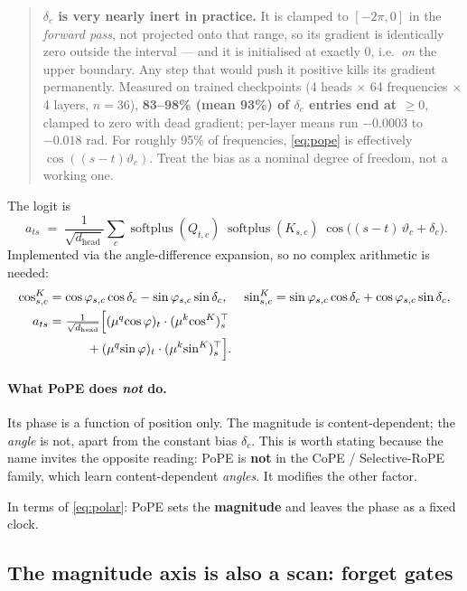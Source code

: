 \documentclass[11pt]{article}
\newcommand{\hd}{d_{\mathrm{head}}}
\DeclareMathOperator{\softplus}{softplus}
\begin{document}
\begin{quote}\small
\textbf{$\delta_c$ is very nearly inert in practice.} It is clamped to $[-2\pi, 0]$
in the \emph{forward pass}, not projected onto that range, so its gradient is
identically zero outside the interval --- and it is initialised at exactly $0$,
i.e.\ \emph{on} the upper boundary. Any step that would push it positive kills its
gradient permanently. Measured on trained checkpoints (4 heads $\times$ 64
frequencies $\times$ 4 layers, $n=36$), \textbf{83--98\% (mean 93\%) of $\delta_c$ entries end at
$\ge 0$}, clamped to zero with dead gradient; per-layer means run $-0.0003$ to
$-0.018$ rad. For roughly 95\% of frequencies, \eqref{eq:pope} is effectively
$\cos((s-t)\vartheta_c)$. Treat the bias as a nominal degree of freedom, not a
working one.
\end{quote}
The logit is
\begin{equation}
  \label{eq:pope}
  \boxed{\;a_{ts} \;=\; \frac{1}{\sqrt{\hd}}\sum_{c}
    \softplus(Q_{t,c})\;\softplus(K_{s,c})\;
    \cos\!\big((s-t)\,\vartheta_c + \delta_c\big).}
\end{equation}
Implemented via the angle-difference expansion, so no complex arithmetic is
needed:
\begin{align}
  \cos^K_{s,c} &= \cos\varphi_{s,c}\cos\delta_c - \sin\varphi_{s,c}\sin\delta_c, &
  \sin^K_{s,c} &= \sin\varphi_{s,c}\cos\delta_c + \cos\varphi_{s,c}\sin\delta_c,\\
  a_{ts} &= \tfrac{1}{\sqrt{\hd}}\Big[
      (\mu^q\!\cos\varphi)_t \cdot (\mu^k\!\cos^K)_s^{\top}\notag\\
    &\qquad\quad
    + (\mu^q\!\sin\varphi)_t \cdot (\mu^k\!\sin^K)_s^{\top}\Big].
\end{align}

\paragraph{What PoPE does \emph{not} do.} Its phase is a function of position
only. The magnitude is content-dependent; the \emph{angle} is not, apart from the
constant bias $\delta_c$. This is worth stating because the name invites the
opposite reading: PoPE is \textbf{not} in the CoPE / Selective-RoPE family, which
learn content-dependent \emph{angles}. It modifies the other factor.

\medskip
\noindent In terms of \eqref{eq:polar}: PoPE sets the \textbf{magnitude} and
leaves the phase as a fixed clock.

\subsection{The magnitude axis is also a scan: forget gates}
\label{sec:decay}
\end{document}
